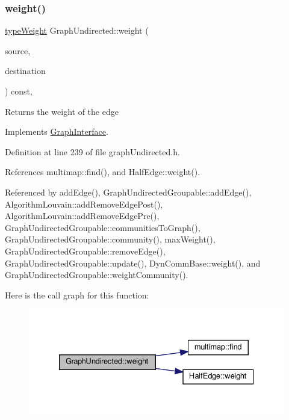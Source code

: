 \subsubsection{\texorpdfstring{weight()}{weight()}}
{\footnotesize\ttfamily \hyperlink{edge_8h_a2e7ea3be891ac8b52f749ec73fee6dd2}{type\+Weight} Graph\+Undirected\+::weight (\begin{DoxyParamCaption}\item[{const \hyperlink{edge_8h_a5fbd20c46956d479cb10afc9855223f6}{type\+Vertex} \&}]{source,  }\item[{const \hyperlink{edge_8h_a5fbd20c46956d479cb10afc9855223f6}{type\+Vertex} \&}]{destination }\end{DoxyParamCaption}) const\hspace{0.3cm}{\ttfamily [inline]}, {\ttfamily [virtual]}}

\begin{DoxyReturn}{Returns}
the weight of the edge 
\end{DoxyReturn}


Implements \hyperlink{classGraphInterface_a27f350094f566bb4840f22c5bc0695c4}{Graph\+Interface}.



Definition at line 239 of file graph\+Undirected.\+h.



References multimap\+::find(), and Half\+Edge\+::weight().



Referenced by add\+Edge(), Graph\+Undirected\+Groupable\+::add\+Edge(), Algorithm\+Louvain\+::add\+Remove\+Edge\+Post(), Algorithm\+Louvain\+::add\+Remove\+Edge\+Pre(), Graph\+Undirected\+Groupable\+::communities\+To\+Graph(), Graph\+Undirected\+Groupable\+::community(), max\+Weight(), Graph\+Undirected\+Groupable\+::remove\+Edge(), Graph\+Undirected\+Groupable\+::update(), Dyn\+Comm\+Base\+::weight(), and Graph\+Undirected\+Groupable\+::weight\+Community().

Here is the call graph for this function\+:
\nopagebreak
\begin{figure}[H]
\begin{center}
\leavevmode
\includegraphics[width=333pt]{classGraphUndirected_ae40d431c92d8b4884c7915c44d42f356_cgraph}
\end{center}
\end{figure}
\mbox{\label{classGraphUndirected_ad2b1cd9a6dded42bd5431134aba26612}} 
